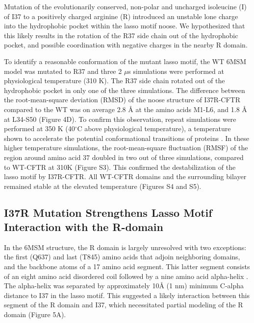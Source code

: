 \endgroup

Mutation of the evolutionarily conserved, non-polar and uncharged isoleucine (I) of I37 to a positively charged arginine (R) introduced an unstable lone charge into the hydrophobic pocket within the lasso motif noose. We hypothesized that this likely results in the rotation of the R37 side chain out of the hydrophobic pocket, and possible coordination with negative charges in the nearby R domain.

To identify a reasonable conformation of the mutant lasso motif, the WT 6MSM model was mutated to R37 and three 2 $\mu$s simulations were performed at physiological temperature (310 K). The R37 side chain rotated out of the hydrophobic pocket in only one of the three simulations. The difference between the root-mean-square deviation (RMSD) of the noose structure of I37R-CFTR compared to the WT was on average 2.8 $\mbox{\AA}$ at the amino acids M1-L6, and 1.8 $\mbox{\AA}$ at L34-S50 (Figure 4D). To confirm this observation, repeat simulations were performed at 350 K (40$^\circ$C above physiological temperature), a temperature shown to accelerate the potential conformational transitions of proteins \cite{beckerman2015}. In these higher temperature simulations, the root-mean-square fluctuation (RMSF) of the region around amino acid 37 doubled in two out of three simulations, compared to WT-CFTR at 310K (Figure S3). This confirmed the destabilization of the lasso motif by I37R-CFTR. All WT-CFTR domains and the surrounding bilayer remained stable at the elevated temperature (Figures S4 and S5).

\subsection{I37R Mutation Strengthens Lasso Motif Interaction with the R-domain}

In the 6MSM structure, the R domain is largely unresolved with two exceptions: the first (Q637) and last (T845) amino acids that adjoin neighboring domains, and the backbone atoms of a 17 amino acid segment. This latter segment consists of an eight amino acid disordered coil followed by a nine amino acid alpha-helix \cite{zhang2018a}. The alpha-helix was separated by approximately 10$\mbox{\AA}$ (1 nm) minimum C-alpha distance to I37 in the lasso motif. This suggested a likely interaction between this segment of the R domain and I37, which necessitated partial modeling of the R domain (Figure 5A).

